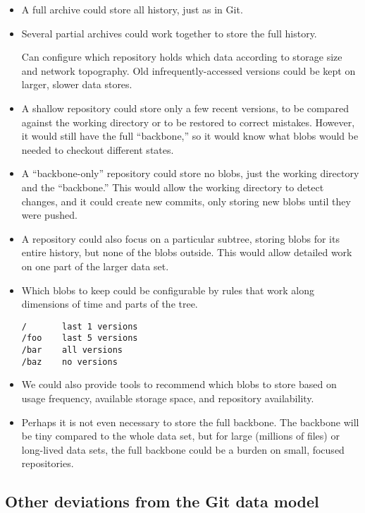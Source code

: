 \documentclass[a4paper]{article}
\begin{document}
\begin{itemize}
\item
  A full archive could store all history, just as in Git.
\item
  Several partial archives could work together to store the full history.

  Can configure which repository holds which data according to storage size
  and network topography. Old infrequently-accessed versions could be kept on
  larger, slower data stores.
\item
  A shallow repository could store only a few recent versions, to be
  compared against the working directory or to be restored to correct
  mistakes. However, it would still have the full ``backbone,'' so it
  would know what blobs would be needed to checkout different states.
\item
  A ``backbone-only'' repository could store no blobs, just the
  working directory and the ``backbone.'' This would allow the working
  directory to detect changes, and it could create new commits, only
  storing new blobs until they were pushed.
\item
  A repository could also focus on a particular subtree, storing blobs
  for its entire history, but none of the blobs outside. This would
  allow detailed work on one part of the larger data set.
\item
  Which blobs to keep could be configurable by rules that work along
  dimensions of time and parts of the tree.

\begin{verbatim}
/       last 1 versions
/foo    last 5 versions
/bar    all versions
/baz    no versions
\end{verbatim}
\item
  We could also provide tools to recommend which blobs to store based
  on usage frequency, available storage space, and repository
  availability.
\item
  Perhaps it is not even necessary to store the full backbone. The
  backbone will be tiny compared to the whole data set, but for large
  (millions of files) or long-lived data sets, the full backbone could
  be a burden on small, focused repositories.
\end{itemize}


\subsection{Other deviations from the Git data model}
\end{document}
